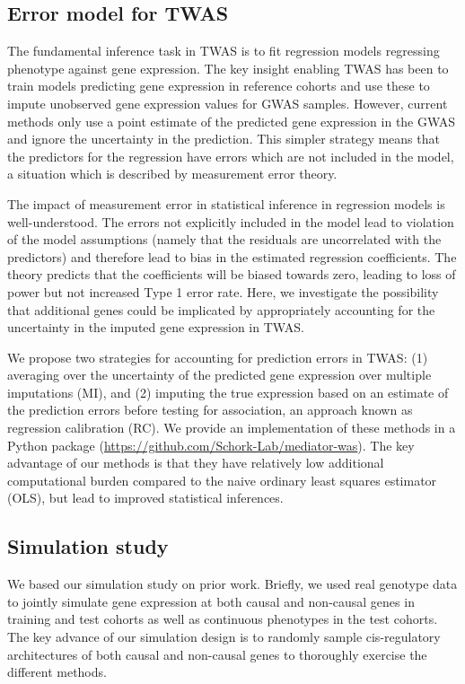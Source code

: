 \documentclass{article}
\begin{document}
\subsection{Error model for TWAS}

The fundamental inference task in TWAS is to fit regression models regressing
phenotype against gene expression. The key insight enabling TWAS has been to
train models predicting gene expression in reference cohorts and use these to
impute unobserved gene expression values for GWAS samples. However, current
methods only use a point estimate of the predicted gene expression in the GWAS
and ignore the uncertainty in the prediction. This simpler strategy means that
the predictors for the regression have errors which are not included in the
model, a situation which is described by measurement error theory.

The impact of measurement error in statistical inference in regression models
is well-understood\cite{fuller1987}. The errors not explicitly included in the
model lead to violation of the model assumptions (namely that the residuals are
uncorrelated with the predictors) and therefore lead to bias in the estimated
regression coefficients. The theory predicts that the coefficients will be
biased towards zero, leading to loss of power but not increased Type 1 error
rate. Here, we investigate the possibility that additional genes could be
implicated by appropriately accounting for the uncertainty in the imputed gene
expression in TWAS.

We propose two strategies for accounting for prediction errors in TWAS: (1)
averaging over the uncertainty of the predicted gene expression over multiple
imputations (MI), and (2) imputing the true expression based on an estimate of
the prediction errors before testing for association, an approach known as
regression calibration (RC). We provide an implementation of these methods in a
Python package (\url{https://github.com/Schork-Lab/mediator-was}). The key
advantage of our methods is that they have relatively low additional
computational burden compared to the naive ordinary least squares estimator
(OLS), but lead to improved statistical inferences.

\subsection{Simulation study}

We based our simulation study on prior work\cite{10.1038/ng.3506}. Briefly, we
used real genotype data to jointly simulate gene expression at both causal and
non-causal genes in training and test cohorts as well as continuous phenotypes
in the test cohorts. The key advance of our simulation design is to randomly
sample cis-regulatory architectures of both causal and non-causal genes to
thoroughly exercise the different methods.
\end{document}
